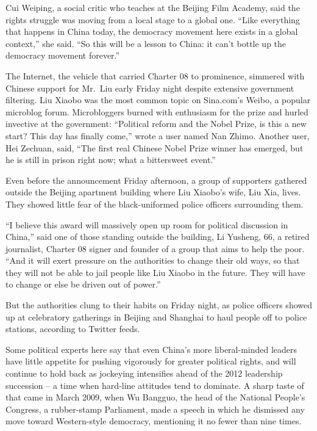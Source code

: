 ﻿\documentclass[12pt]{article}
\begin{document}
Cui Weiping, a social critic who teaches at the Beijing Film Academy, said the rights struggle was
moving from a local stage to a global one. ``Like everything that happens in China today, the
democracy movement here exists in a global context,'' she said. ``So this will be a lesson to China:
it can't bottle up the democracy movement forever.''

The Internet, the vehicle that carried Charter 08 to prominence, simmered with Chinese support for
Mr.~Liu early Friday night despite extensive government filtering. Liu Xiaobo was the most common
topic on Sina.com's Weibo, a popular microblog forum. Microbloggers burned with enthusiasm for the
prize and hurled invective at the government: ``Political reform and the Nobel Prize, is this a new
start? This day has finally come,'' wrote a user named Nan Zhimo. Another user, Hei Zechuan, said,
``The first real Chinese Nobel Prize winner has emerged, but he is still in prison right now; what a
bittersweet event.''

Even before the announcement Friday afternoon, a group of supporters gathered outside the Beijing
apartment building where Liu Xiaobo's wife, Liu Xia, lives. They showed little fear of the
black-uniformed police officers surrounding them.

``I believe this award will massively open up room for political discussion in China,'' said one of
those standing outside the building, Li Yusheng, 66, a retired journalist, Charter 08 signer and
founder of a group that aims to help the poor. ``And it will exert pressure on the authorities to
change their old ways, so that they will not be able to jail people like Liu Xiaobo in the future.
They will have to change or else be driven out of power.''

But the authorities clung to their habits on Friday night, as police officers showed up at
celebratory gatherings in Beijing and Shanghai to haul people off to police stations, according to
Twitter feeds.

Some political experts here say that even China's more liberal-minded leaders have little appetite
for pushing vigorously for greater political rights, and will continue to hold back as jockeying
intensifies ahead of the 2012 leadership succession -- a time when hard-line attitudes tend to
dominate. A sharp taste of that came in March 2009, when Wu Bangguo, the head of the National
People's Congress, a rubber-stamp Parliament, made a speech in which he dismissed any move toward
Western-style democracy, mentioning it no fewer than nine times.
\end{document}
